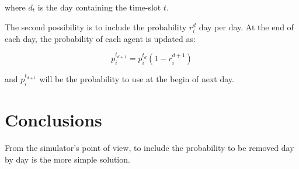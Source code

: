\documentclass[12pt, a4paper]{article}
\newcommand{\expr}[1]{\left(#1\right)}
\begin{document}
where $d_t$ is the day containing the time-slot $t$.

The second possibility is to include the probability $r^{d}_i$ day per day. At the end of each day, the probability of each agent is updated as:

\begin{equation}
     p_i^{t_{d+1}} = p_i^{t_d}\expr{1 - r^{d+1}_i}
\end{equation}

and $p_i^{t_{d+1}}$ will be the probability to use at the begin of next day.


\section{Conclusions}

From the simulator's point of view, to include the probability to be removed day by day is the more simple solution.
\end{document}

